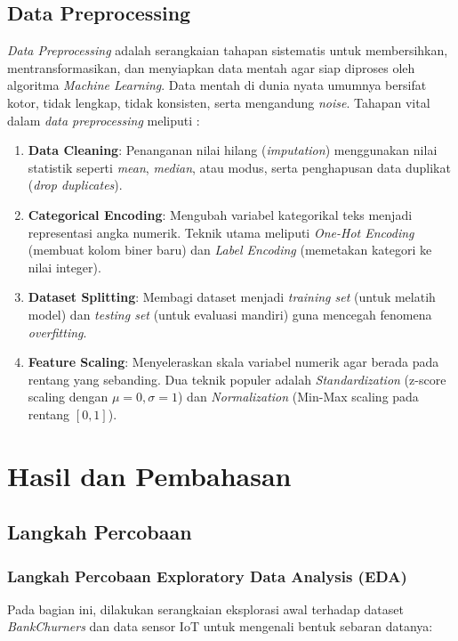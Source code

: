 \documentclass[a4paper,oneside,12pt]{report}
\begin{document}
\section{Data Preprocessing}
\textit{Data Preprocessing} adalah serangkaian tahapan sistematis untuk membersihkan, mentransformasikan, dan menyiapkan data mentah agar siap diproses oleh algoritma \textit{Machine Learning}. Data mentah di dunia nyata umumnya bersifat kotor, tidak lengkap, tidak konsisten, serta mengandung \textit{noise}. Tahapan vital dalam \textit{data preprocessing} meliputi \cite{ref4,ref6}:
\begin{enumerate}
    \item \textbf{Data Cleaning}: Penanganan nilai hilang (\textit{imputation}) menggunakan nilai statistik seperti \textit{mean}, \textit{median}, atau modus, serta penghapusan data duplikat (\textit{drop duplicates}).
    \item \textbf{Categorical Encoding}: Mengubah variabel kategorikal teks menjadi representasi angka numerik. Teknik utama meliputi \textit{One-Hot Encoding} (membuat kolom biner baru) dan \textit{Label Encoding} (memetakan kategori ke nilai integer).
    \item \textbf{Dataset Splitting}: Membagi dataset menjadi \textit{training set} (untuk melatih model) dan \textit{testing set} (untuk evaluasi mandiri) guna mencegah fenomena \textit{overfitting}.
    \item \textbf{Feature Scaling}: Menyeleraskan skala variabel numerik agar berada pada rentang yang sebanding. Dua teknik populer adalah \textit{Standardization} (z-score scaling dengan $\mu=0, \sigma=1$) dan \textit{Normalization} (Min-Max scaling pada rentang $[0, 1]$).
\end{enumerate}
\clearpage

\chapter{Hasil dan Pembahasan}

\section{Langkah Percobaan}

\subsection{Langkah Percobaan Exploratory Data Analysis (EDA)}
Pada bagian ini, dilakukan serangkaian eksplorasi awal terhadap dataset \textit{BankChurners} dan data sensor IoT untuk mengenali bentuk sebaran datanya:
\end{document}
